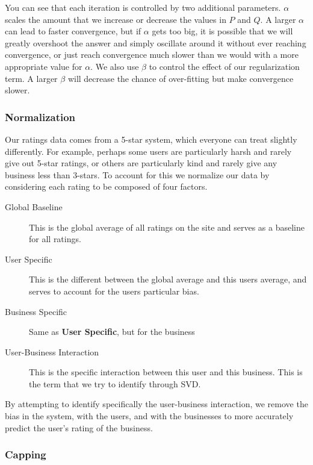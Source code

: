 You can see that each iteration is controlled by two additional parameters.
$\alpha$ scales the amount that we increase or decrease the values in $P$ and
$Q$. A larger $\alpha$ can lead to faster convergence, but if $\alpha$ gets too
big, it is possible that we will greatly overshoot the answer and simply
oscillate around it without ever reaching convergence, or just reach
convergence much slower than we would with a more appropriate value for
$\alpha$. We also use $\beta$ to control the effect of our regularization term.
A larger $\beta$ will decrease the chance of over-fitting but make convergence
slower.

\subsubsection{Normalization}

Our ratings data comes from a 5-star system, which everyone can treat slightly
differently.  For example, perhaps some users are particularly harsh and rarely
give out 5-star ratings, or others are particularly kind and rarely give any
business less than 3-stars. To account for this we normalize our data by
considering each rating to be composed of four factors.

\begin{description}

  \item[Global Baseline] This is the global average of all ratings on the site
and serves as a baseline for all ratings.

  \item[User Specific] This is the different between the global average and
this users average, and serves to account for the users particular bias.

  \item[Business Specific] Same as \textbf{User Specific}, but for the business

  \item[User-Business Interaction] This is the specific interaction between this
user and this business. This is the term that we try to identify through SVD. 

\end{description}

By attempting to identify specifically the user-business interaction, we remove
the bias in the system, with the users, and with the businesses to more
accurately predict the user's rating of the business. 

\subsubsection{Capping}


